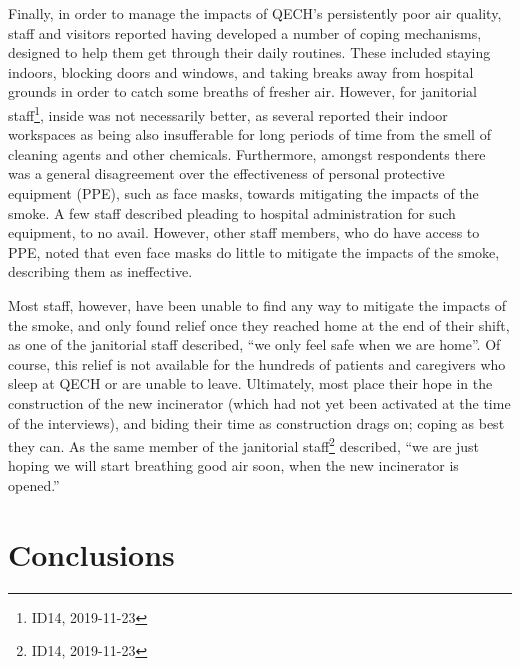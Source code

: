 \documentclass[
  authoryear,
  review,
  3p]{elsarticle}
\begin{document}
Finally, in order to manage the impacts of QECH's persistently poor air
quality, staff and visitors reported having developed a number of coping
mechanisms, designed to help them get through their daily routines.
These included staying indoors, blocking doors and windows, and taking
breaks away from hospital grounds in order to catch some breaths of
fresher air. However, for janitorial staff\footnote{ID14, 2019-11-23},
inside was not necessarily better, as several reported their indoor
workspaces as being also insufferable for long periods of time from the
smell of cleaning agents and other chemicals. Furthermore, amongst
respondents there was a general disagreement over the effectiveness of
personal protective equipment (PPE), such as face masks, towards
mitigating the impacts of the smoke. A few staff described pleading to
hospital administration for such equipment, to no avail. However, other
staff members, who do have access to PPE, noted that even face masks do
little to mitigate the impacts of the smoke, describing them as
ineffective.

Most staff, however, have been unable to find any way to mitigate the
impacts of the smoke, and only found relief once they reached home at
the end of their shift, as one of the janitorial staff described, ``we
only feel safe when we are home''. Of course, this relief is not
available for the hundreds of patients and caregivers who sleep at QECH
or are unable to leave. Ultimately, most place their hope in the
construction of the new incinerator (which had not yet been activated at
the time of the interviews), and biding their time as construction drags
on; coping as best they can. As the same member of the janitorial
staff\footnote{ID14, 2019-11-23} described, ``we are just hoping we will
start breathing good air soon, when the new incinerator is opened.''

\hypertarget{conclusions}{%
\section{Conclusions}\label{conclusions}}
\end{document}
